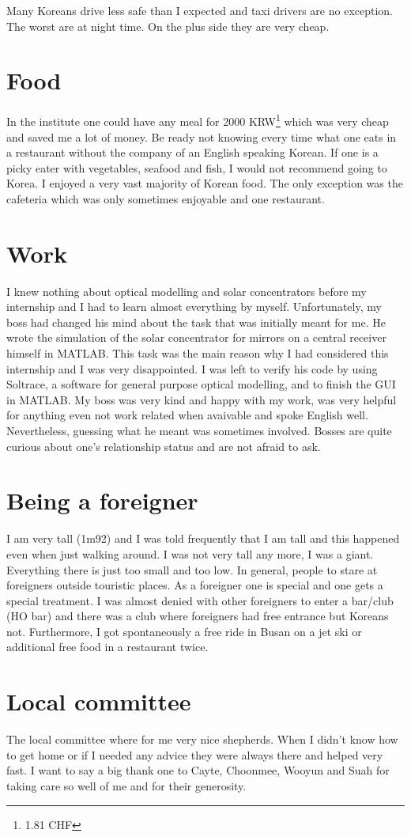 Many Koreans drive less safe than I expected and taxi drivers are no exception. The worst are at night time. On the plus side they are very cheap.
\section*{Food}
In the institute one could have any meal for 2000 KRW\footnote{1.81 CHF} which was very cheap and saved me a lot of money. Be ready not knowing every time what one eats in a restaurant without the company of an English speaking Korean. If one is a picky eater with vegetables, seafood and fish, I would not recommend going to Korea. I enjoyed a very vast majority of Korean food. The only exception was the cafeteria which was only sometimes enjoyable and one restaurant.
\section*{Work}
I knew nothing about optical modelling and solar concentrators before my internship and I had to learn almost everything by myself. Unfortunately, my boss had changed his mind about the task that was initially meant for me. He wrote the simulation of the solar concentrator for mirrors on a central receiver himself in MATLAB. This task was the main reason why I had considered this internship and I was very disappointed. I was left to verify his code by using Soltrace, a software for general purpose optical modelling, and to finish the GUI in MATLAB. My boss was very kind and happy with my work, was very helpful for anything even not work related when avaivable and spoke English well. Nevertheless, guessing what he meant was sometimes involved. Bosses are quite curious about one's relationship status and are not afraid to ask.
\section*{Being a foreigner}
I am very tall (1m92) and I was told frequently that I am tall and this happened even when just walking around. I was not very tall any more, I was a giant. Everything there is just too small and too low. 
In general, people to stare at foreigners outside touristic places. As a foreigner one is special and one gets a special treatment. I was almost denied with other foreigners to enter a bar/club (HO bar) and there was a club where foreigners had free entrance but Koreans not. Furthermore, I got spontaneously a free ride in Busan on a jet ski or additional free food in a restaurant twice.
\section*{Local committee}
The local committee where for me very nice shepherds. When I didn't know how to get home or if I needed any advice they were always there and helped very fast. I want to say a big thank one to Cayte, Choonmee, Wooyun and Suah for taking care so well of me and for their generosity.

